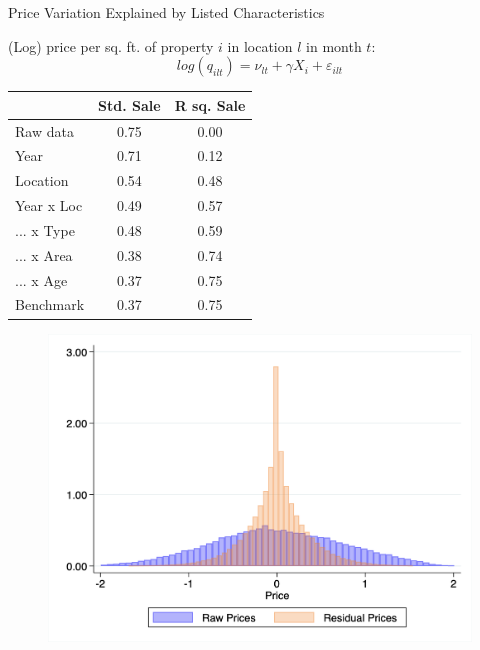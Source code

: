 \documentclass[english,xcolor=svgnames,aspectratio=169]{beamer}
\begin{document}
\begin{frame}{Price Variation Explained by Listed Characteristics}
\medskip
\begin{center}
{(Log) price per sq. ft. of property $i$ in location $l$ in month $t$:}
$$log(q_{ilt}) = \nu_{lt} + \gamma X_{i} + \varepsilon_{ilt}$$
\end{center}
\begin{minipage}{.5\textwidth}
\begin{table}
\begin{tabularx}{5.9cm}{lcc}
\toprule
{}&{Std. Sale}&{R sq. Sale} \tabularnewline
\midrule \addlinespace[\belowrulesep]
Raw data&0.75&0.00 \tabularnewline
\midrule Year &0.71&0.12 \tabularnewline
Location&0.54&0.48 \tabularnewline
Year x Loc&0.49&0.57 \tabularnewline
... x Type&0.48&0.59 \tabularnewline
... x Area&0.38&0.74 \tabularnewline
... x Age&0.37&0.75 \tabularnewline
\midrule
Benchmark&0.37&0.75 \tabularnewline
\bottomrule
\end{tabularx}
\end{table}
\end{minipage}
\begin{minipage}{.3\textwidth}
\begin{figure}[H]
\centering
\includegraphics[scale=0.24]{figures/hist_satur_2.png}
\end{figure}
\end{minipage}
\end{frame}


%
\end{document}
